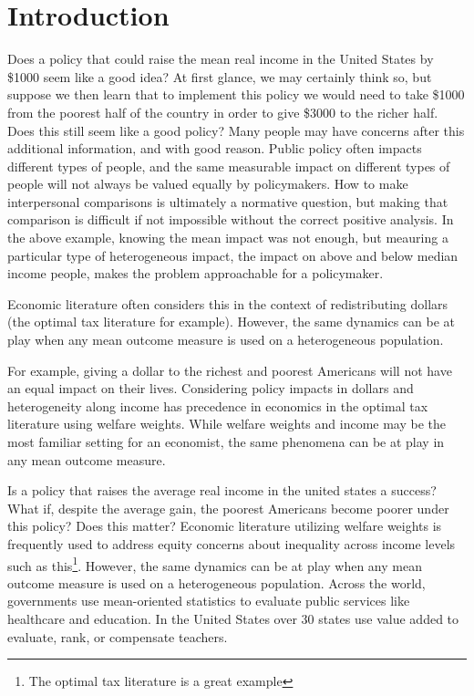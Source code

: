 \documentclass[12pt]{article}
\theoremstyle{definition}
\theoremstyle{definition}
\theoremstyle{definition}
\theoremstyle{definition}
\begin{document}
\onehalfspacing
\section{Introduction}

    Does a policy that could raise the mean real income in the United States by \$1000 seem like a good idea? At first glance, we may certainly think so, but suppose we then learn that to implement this policy we would need to take \$1000 from the poorest half of the country in order to give \$3000 to the richer half. Does this still seem like a good policy? Many people may have concerns after this additional information, and with good reason. Public policy often impacts different types of people, and the same measurable impact on different types of people will not always be valued equally by policymakers. How to make interpersonal comparisons is ultimately a normative question, but making that comparison is difficult if not impossible without the correct positive analysis. In the above example, knowing the mean impact was not enough, but meauring a particular type of heterogeneous impact, the impact on above and below median income people, makes the problem approachable for a policymaker. 

    Economic literature often considers this in the context of redistributing dollars (the optimal tax literature for example). However, the same dynamics can be at play when any mean outcome measure is used on a heterogeneous population.

    
    
    For example, giving a dollar to the richest and poorest Americans will not have an equal impact on their lives. Considering policy impacts in dollars and heterogeneity along income has precedence in economics in the optimal tax literature using welfare weights. While welfare weights and income may be the most familiar setting for an economist, the same phenomena can be at play in any mean outcome measure.

    Is a policy that raises the average real income in the united states a success? What if, despite the average gain, the poorest Americans become poorer under this policy? Does this matter? Economic literature utilizing welfare weights is frequently used to address equity concerns about inequality across income levels such as this\footnote{The optimal tax literature is a great example}. However, the same dynamics can be at play when any mean outcome measure is used on a heterogeneous population.  
    Across the world, governments use mean-oriented statistics to evaluate public services like healthcare and education. In the United States over 30 states use value added to evaluate, rank, or compensate teachers. 
    
\end{document}
